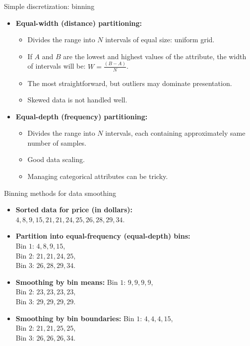 \documentclass[aspectratio=169,t]{beamer}
\begin{document}
  {
    \begin{frame}{Simple discretization: binning}
    \begin{itemize}
      \item \textbf{Equal-width (distance) partitioning:}
      \begin{itemize}
        \item Divides the range into $N$ intervals of equal size: uniform grid.
        \item If $A$ and $B$ are the lowest and highest values of the attribute, the width of intervals will be: $W = \frac{(B - A)}{N}$.
        \item The most straightforward, but outliers may dominate presentation.
        \item Skewed data is not handled well.
      \end{itemize}
      \item \textbf{Equal-depth (frequency) partitioning:}
      \begin{itemize}
        \item Divides the range into $N$ intervals, each containing approximately same number of samples.
        \item Good data scaling.
        \item Managing categorical attributes can be tricky.
      \end{itemize}
    \end{itemize}
    \end{frame}
  }

  {
    \begin{frame}{Binning methods for data smoothing}
    \begin{itemize}
      \item \textbf{Sorted data for price (in dollars):} \\
            $4, 8, 9, 15, 21, 21, 24, 25, 26, 28, 29, 34$.
      \item \textbf{Partition into equal-frequency (equal-depth) bins:}\\
            Bin $1$: $4, 8, 9, 15$,\\
            Bin $2$: $21, 21, 24, 25$,\\
            Bin $3$: $26, 28, 29, 34$.
      \item \textbf{Smoothing by bin means:}
            Bin $1$: $9, 9, 9, 9$,\\
            Bin $2$: $23, 23, 23, 23$,\\
            Bin $3$: $29, 29, 29, 29$.\\
      \item \textbf{Smoothing by bin boundaries:}
            Bin $1$: $4, 4, 4, 15$,\\
            Bin $2$: $21, 21, 25, 25$,\\
            Bin $3$: $26, 26, 26, 34$.\\
    \end{itemize}
    \end{frame}
  }
\end{document}
